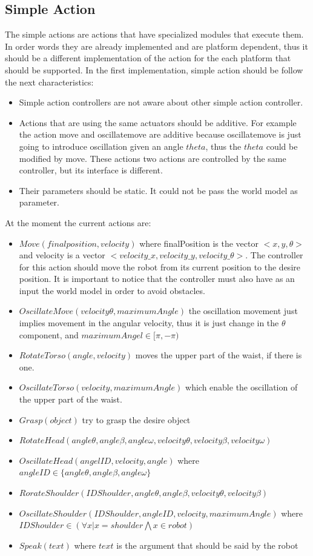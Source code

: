 \subsection{Simple Action}
The simple actions are actions that have specialized modules that execute them. In order words they are already implemented and are platform dependent, thus it should be a different implementation of the action for the each platform that should be supported. In the first implementation, simple action should be follow the next characteristics:
\begin{itemize}
	\item Simple action controllers are not aware about other simple action controller.
	\item Actions that are using the same actuators should be additive. For example the action move and oscillatemove are additive because oscillatemove is just going to introduce oscillation given an angle $theta$, thus the $theta$ could be modified by move. These actions two actions are controlled by the same controller, but its interface is different.
	\item Their parameters should be static. It could not be pass the world model as parameter.
\end{itemize} 
At the moment the current actions are:
\begin{itemize}
	\item $Move(finalposition,velocity)$ where finalPosition is the vector $<x,y,\theta>$ and velocity is a vector $<velocity\_x,velocity\_y,velocity\_\theta>$. The controller for this action should move the robot from its current position to the desire position. It is important to notice that the controller must also have as an input the world model in order to avoid obstacles.
	\item $OscillateMove(velocity\theta,maximumAngle)$ the oscillation movement just implies movement in the angular velocity, thus it is just change in the $\theta$ component, and $maximumAngel\in[\pi,-\pi)$
	\item $RotateTorso(angle,velocity)$ moves the upper part of the waist, if there is one.
	\item $OscillateTorso(velocity,maximumAngle)$ which enable the oscillation of the upper part of the waist.
	\item $Grasp(object)$ try to grasp the desire object
	\item $RotateHead(angle\theta,angle\beta,angle\omega,velocity\theta,velocity\beta,velocity\omega)$
	\item $OscillateHead(angelID,velocity,angle)$ where\\ $angleID\in \lbrace angle\theta,angle\beta,angle\omega \rbrace$
	\item $RorateShoulder(IDShoulder,angle\theta,angle\beta,velocity\theta,velocity\beta)$
	\item $OscillateShoulder(IDShoulder,angleID,velocity,maximumAngle)$ where\\ $IDShoulder\in (\forall x| x=shoulder\bigwedge x\in robot)$
	\item $Speak(text)$ where $text$ is the argument that should be said by the robot
\end{itemize} 
